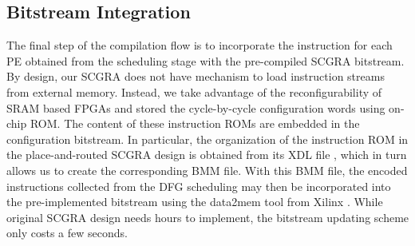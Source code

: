 \subsection{Bitstream Integration}
The final step of the compilation flow is to incorporate the instruction for each PE obtained from the scheduling stage with the pre-compiled SCGRA bitstream. By design, our SCGRA does not have mechanism to load instruction streams from external memory. Instead, we take advantage of the reconfigurability of SRAM based FPGAs and stored the cycle-by-cycle configuration words using on-chip ROM. The content of these instruction ROMs are embedded in the configuration bitstream. In particular, the organization of the instruction ROM in the place-and-routed SCGRA design is obtained from its XDL file \cite{beckhoff2011xilinx}, which in turn allows us to create the corresponding BMM file. With this BMM file, the encoded instructions collected from the DFG scheduling may then be incorporated into the pre-implemented bitstream using the data2mem tool from Xilinx \cite{data2mem}. While original SCGRA design needs hours to implement, the bitstream updating scheme only costs a few seconds.
